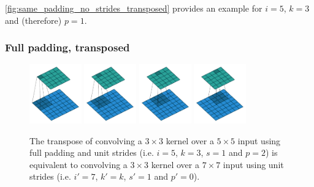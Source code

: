 \documentclass{article}
\begin{document}
\autoref{fig:same_padding_no_strides_transposed} provides an example for $i =
5$, $k = 3$ and (therefore) $p = 1$.

\subsubsection{Full padding, transposed}

\begin{figure}[h]
    \centering
    \includegraphics[width=0.2\textwidth]
        {pdf/full_padding_no_strides_transposed_00.pdf}
    \includegraphics[width=0.2\textwidth]
        {pdf/full_padding_no_strides_transposed_01.pdf}
    \includegraphics[width=0.2\textwidth]
        {pdf/full_padding_no_strides_transposed_02.pdf}
    \includegraphics[width=0.2\textwidth]
        {pdf/full_padding_no_strides_transposed_03.pdf}
    \caption{\label{fig:full_padding_no_strides_transposed} The transpose
        of convolving a $3 \times 3$ kernel over a $5 \times 5$ input using full
        padding and unit strides (i.e. $i = 5$, $k = 3$, $s = 1$ and $p = 2$) is
        equivalent to convolving a $3 \times 3$ kernel over a $7 \times 7$ input
        using unit strides (i.e. $i' = 7$, $k' = k$, $s' = 1$ and $p' = 0$).}
\end{figure}
\end{document}
